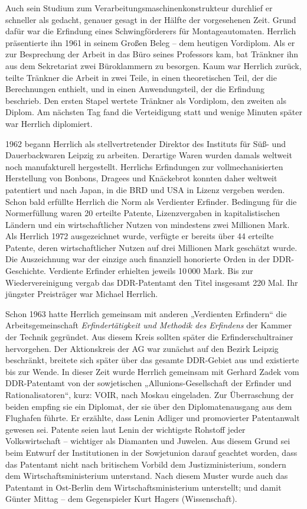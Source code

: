 \documentclass[11pt,a4paper]{article}
\begin{document}
Auch sein Studium zum Verarbeitungsmaschinenkonstrukteur durchlief er
schneller als gedacht, genauer gesagt in der Hälfte der vorgesehenen
Zeit. Grund dafür war die Erfindung eines Schwingförderers für
Montageautomaten. Herrlich präsentierte ihn 1961 in seinem Großen Beleg – dem
heutigen Vordiplom. Als er zur Besprechung der Arbeit in das Büro seines
Professors kam, bat Tränkner ihn aus dem Sekretariat zwei Büroklammern zu
besorgen. Kaum war Herrlich zurück, teilte Tränkner die Arbeit in zwei Teile,
in einen theoretischen Teil, der die Berechnungen enthielt, und in einen
Anwendungsteil, der die Erfindung beschrieb. Den ersten Stapel wertete
Tränkner als Vordiplom, den zweiten als Diplom. Am nächsten Tag fand die
Verteidigung statt und wenige Minuten später war Herrlich diplomiert.

1962 begann Herrlich als stellvertretender Direktor des Instituts für Süß- und
Dauerbackwaren Leipzig zu arbeiten. Derartige Waren wurden damals weltweit
noch manufakturell hergestellt. Herrlichs Erfindungen zur vollmechanisierten
Herstellung von Bonbons, Dragees und Knäckebrot konnten daher weltweit
patentiert und nach Japan, in die BRD und USA in Lizenz vergeben werden. Schon
bald erfüllte Herrlich die Norm als Verdienter Erfinder. Bedingung für die
Normerfüllung waren 20 erteilte Patente, Lizenzvergaben in kapitalistischen
Ländern und ein wirtschaftlicher Nutzen von mindestens zwei Millionen Mark.
Als Herrlich 1972 ausgezeichnet wurde, verfügte er bereits über 44 erteilte
Patente, deren wirtschaftlicher Nutzen auf drei Millionen Mark geschätzt
wurde. Die Auszeichnung war der einzige auch finanziell honorierte Orden in
der DDR-Geschichte. Verdiente Erfinder erhielten jeweils 10\,000 Mark. Bis zur
Wiedervereinigung vergab das DDR-Patentamt den Titel insgesamt 220 Mal. Ihr
jüngster Preisträger war Michael Herrlich.

Schon 1963 hatte Herrlich gemeinsam mit anderen „Verdienten Erfindern“ die
Arbeitsgemeinschaft \emph{Erfindertätigkeit und Methodik des Erfindens} der
Kammer der Technik gegründet. Aus diesem Kreis sollten später die
Erfinderschultrainer hervorgehen.  Der Aktionskreis der AG war zunächst auf
den Bezirk Leipzig beschränkt, breitete sich später über das gesamte
DDR-Gebiet aus und existierte bis zur Wende. In dieser Zeit wurde Herrlich
gemeinsam mit Gerhard Zadek vom DDR-Patentamt von der sowjetischen
„Allunions-Gesellschaft der Erfinder und Rationalisatoren“, kurz: VOIR, nach
Moskau eingeladen. Zur Überraschung der beiden empfing sie ein Diplomat, der
sie über den Diplomatenausgang aus dem Flughafen führte. Er erzählte, dass
Lenin Adliger und promovierter Patentanwalt gewesen sei. Patente seien laut
Lenin der wichtigste Rohstoff jeder Volkswirtschaft – wichtiger als Diamanten
und Juwelen. Aus diesem Grund sei beim Entwurf der Institutionen in der
Sowjetunion darauf geachtet worden, dass das Patentamt nicht nach britischem
Vorbild dem Justizministerium, sondern dem Wirtschaftsministerium unterstand.
Nach diesem Muster wurde auch das Patentamt in Ost-Berlin dem
Wirtschaftsministerium unterstellt; und damit Günter Mittag – dem Gegenspieler
Kurt Hagers (Wissenschaft).
\end{document}
